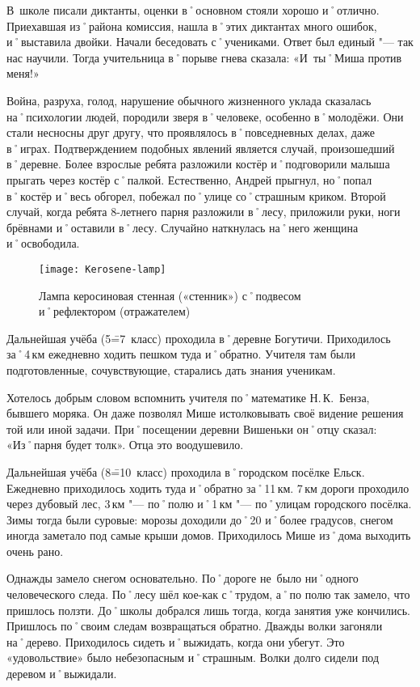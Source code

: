 В~школе писали диктанты, оценки в˚основном стояли хорошо и˚отлично. Приехавшая из˚района комиссия, нашла в˚этих диктантах много ошибок, и˚выставила двойки. Начали беседовать с˚учениками. Ответ был единый "--- так нас научили. Тогда учительница в˚порыве гнева сказала: «И~ты˚Миша против меня!»

Война, разруха, голод, нарушение обычного жизненного уклада сказалась на˚психологии людей, породили зверя в˚человеке, особенно в˚молодёжи. Они стали несносны друг другу, что проявлялось в˚повседневных делах, даже в˚играх. Подтверждением подобных явлений является случай, произошедший в˚деревне. Более взрослые ребята разложили костёр и˚подговорили малыша прыгать через костёр с˚палкой. Естественно, Андрей прыгнул, но˚попал в˚костёр и˚весь обгорел, побежал по˚улице со˚страшным криком. Второй случай, когда ребята 8-летнего парня разложили в˚лесу, приложили руки, ноги брёвнами и˚оставили в˚лесу. Случайно наткнулась на˚него женщина и˚освободила.

\begin{wrapfigure}{O}{.25\textwidth}
\centering
\texttt{[image: Kerosene-lamp]}
\caption[Лампа керосиновая стенная («стенник») с˚подвесом и˚рефлектором (отражателем)]{Лампа керосиновая стенная («стенник») с˚подвесом и˚рефлектором (отражателем)\footnotemark}
\label{fig:Kerosene-lamp}
\end{wrapfigure}

Дальнейшая учёба (5\==7~класс) проходила в˚деревне Богутичи. Приходилось за˚4\,км ежедневно ходить пешком туда и˚обратно. Учителя там были подготовленные, сочувствующие, старались дать знания ученикам. 

Хотелось добрым словом вспомнить учителя по˚математике Н.\,К.~Бенза, бывшего моряка. Он даже позволял Мише истолковывать своё видение решения той или иной задачи. При˚посещении деревни Вишеньки он˚отцу сказал: «Из˚парня будет толк». Отца это воодушевило.

Дальнейшая учёба (8\==10~класс) проходила в˚городском посёлке Ельск. Ежедневно приходилось ходить туда и˚обратно за˚11\,км. 7\,км дороги проходило через дубовый лес, 3\,км "--- по˚полю и˚1\,км "--- по˚улицам городского посёлка. Зимы тогда были суровые: морозы доходили до˚20 и˚более градусов, снегом иногда заметало под самые крыши домов. Приходилось Мише из˚дома выходить очень рано. 

Однажды замело снегом основательно. По˚дороге не~было ни˚одного человеческого следа. По˚лесу шёл кое-как с˚трудом, а˚по полю так замело, что пришлось ползти. До˚школы добрался лишь тогда, когда занятия уже кончились. Пришлось по˚своим следам возвращаться обратно. Дважды волки загоняли на˚дерево. Приходилось сидеть и˚выжидать, когда они убегут. Это «удовольствие» было небезопасным и˚страшным. Волки долго сидели под деревом и˚выжидали.

